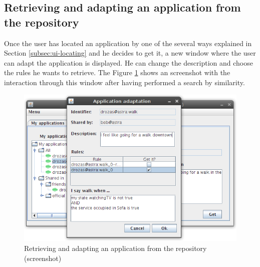\subsection{Retrieving and adapting an application from the repository}
Once the user has located an application by one of the several ways explained
in Section \ref{subsec:ui-locating} and he decides to get it, a new window
where the user can adapt the application is displayed. He can change the
description and choose the rules he wants to retrieve. The Figure
\ref{img:ui-retrieving} shows an screenshot with the interaction through this
window after having performed a search by similarity.

\begin{figure}[h!]
 \begin{center}
 \includegraphics[scale=0.6]{screenshots/ui-retrieving.png}
  \caption{\label{img:ui-retrieving}Retrieving and adapting an application
  from the repository (screenshot)}
 \end{center}
\end{figure}

